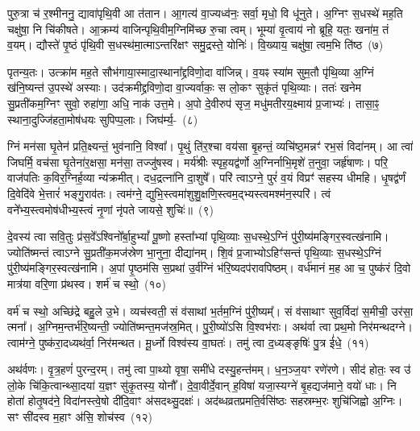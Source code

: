 पुरु॒त्रा च॑ र॒श्मीननु॒ द्यावा॑\-पृथि॒वी आ त॑तान। आ॒गत्य॑ वा॒ज्यध्व॑नः॒ सर्वा॒ मृधो॒ वि धू॑नुते। अ॒ग्निꣳ स॒धस्थे॑ मह॒ति चक्षु॑षा॒ नि चि॑कीषते। आ॒क्रम्य॑ वाजिन्पृथि॒वीम॒ग्निमि॑च्छ रु॒चा त्वम्। भूम्या॑ वृ॒त्वाय॑ नो ब्रूहि॒ यतः॒ खना॑म॒ तं व॒यम्। द्यौस्ते॑ पृ॒ष्ठं पृ॑थि॒वी स॒धस्थ॑मा॒त्माऽन्तरि॑क्षꣳ समु॒द्रस्ते॒ योनिः॑। वि॒ख्याय॒ चक्षु॑षा॒ त्वम॒भि ति॑ष्ठ~(७)\ip

पृतन्य॒तः। उत्क्रा॑म मह॒ते सौभ॑गाया॒स्मादा॒स्थाना᳚द्द्रविणो॒दा वा॑जिन्न्। व॒यꣴ स्या॑म सुम॒तौ पृ॑थि॒व्या अ॒ग्निं ख॑नि॒ष्यन्त॑ उ॒पस्थे॑ अस्याः। उद॑क्रमीद्द्रविणो॒दा वा॒ज्यर्वाकः॒ स लो॒कꣳ सुकृ॑तं पृथि॒व्याः। ततः॑ खनेम सु॒प्रती॑कम॒ग्निꣳ सुवो॒ रुहा॑णा॒ अधि॒ नाक॑ उत्त॒मे। अ॒पो दे॒वीरुप॑ सृज॒ मधु॑मतीरय॒क्ष्माय॑ प्र॒जाभ्यः॑। तासा॒ꣴ॒ स्थाना॒दुज्जि॑हता॒मोष॑धयः सुपिप्प॒लाः। जिघ॑र्म्य॒-~(८)\ip

ग्निं मन॑सा घृ॒तेन॑ प्रति॒क्ष्यन्तं॒ भुव॑नानि॒ विश्वा᳚। पृ॒थुं ति॑र॒श्चा वय॑सा बृ॒हन्तं॒ व्यचि॑ष्ठ॒मन्नꣳ॑ रभ॒सं विदा॑नम्। आ त्वा॑ जिघर्मि॒ वच॑सा घृ॒तेना॑र॒क्षसा॒ मन॑सा॒ तज्जु॑षस्व। मर्य॑श्रीः स्पृह॒यद्व॑र्णो अ॒ग्निर्नाभि॒मृशे॑ त॒नुवा॒ जर्\mbox{}हृ॑षाणः। परि॒ वाज॑पतिः क॒विर॒ग्निर्\mbox{}ह॒व्या न्य॑क्रमीत्। दध॒द्रत्ना॑नि दा॒शुषे᳚। परि॑ त्वा\-ऽग्ने॒ पुरं॑ व॒यं विप्रꣳ॑ सहस्य धीमहि। धृ॒षद्व॑र्णं दि॒वेदि॑वे भे॒त्तारं॑ भङ्गु॒राव॑तः। त्वम॑ग्ने॒ द्युभि॒स्त्वमा॑शुशु॒क्षणि॒स्त्वम॒द्भ्यस्त्वमश्म॑न॒स्परि॑। त्वं वने᳚भ्य॒स्त्वमोष॑धीभ्य॒स्त्वं नृ॒णां नृ॑पते जायसे॒ शुचिः॑॥~(९)\ip

{\anuvakamend[{प्र॒तूर्व॒न्थ्सूर्य॑स्य तिष्ठ॒ जिघ॑र्मि भे॒त्तारं॑ विꣳश॒तिश्च॑}]}

दे॒वस्य॑ त्वा सवि॒तुः प्र॑स॒वे᳚\-ऽश्विनो᳚र्बा॒हु\-भ्यां᳚ पू॒ष्णो हस्ता᳚भ्यां पृथि॒व्याः स॒धस्थे॒\-ऽग्निं पु॑री॒ष्य॑मङ्गिर॒\-स्व\-त्ख॑नामि। ज्योति॑ष्मन्तं त्वाऽग्ने सु॒प्रती॑क॒मज॑स्रेण भा॒नुना॒ दीद्या॑नम्। शि॒वं प्र॒जाभ्यो\-ऽहिꣳ॑सन्तं पृथि॒व्याः स॒धस्थे॒\-ऽग्निं पु॑री॒ष्य॑मङ्गिर॒\-स्वत्ख॑नामि। अ॒पां पृ॒ष्ठम॑सि स॒प्रथा॑ उ॒र्व॑ग्निं भ॑रि॒ष्यदप॑रावपिष्ठम्। वर्ध॑मानं म॒ह आ च॒ पुष्क॑रं दि॒वो मात्र॑या वरि॒णा प्र॑थस्व। शर्म॑ च स्थो॒~(१०)\ip

वर्म॑ च स्थो॒ अच्छि॑द्रे बहु॒ले उ॒भे। व्यच॑स्वती॒ सं व॑साथां भ॒र्तम॒ग्निं पु॑री॒ष्यम्᳚। सं व॑साथाꣳ सुव॒र्विदा॑ स॒मीची॒ उर॑सा॒ त्मना᳚। अ॒ग्निम॒न्तर्भ॑रि॒ष्यन्ती॒ ज्योति॑ष्मन्त॒मज॑स्र॒मित्। पु॒री॒ष्यो॑\-ऽसि वि॒श्वभ॑राः। अथ॑र्वा त्वा प्रथ॒मो निर॑मन्थदग्ने। त्वाम॑ग्ने॒ पुष्क॑रा॒दध्यथ॑र्वा॒ निर॑मन्थत। मू॒र्ध्नो विश्व॑स्य वा॒घतः॑। तमु॑ त्वा द॒ध्यङ्ङृषिः॑ पु॒त्र ई॑धे॒~(११)\ip

अथ॑र्वणः। वृ॒त्र॒हणं॑ पुरन्द॒रम्। तमु॑ त्वा पा॒थ्यो वृषा॒ समी॑धे दस्यु॒हन्त॑मम्। ध॒न॒ञ्ज॒यꣳ रणे॑रणे। सीद॑ होतः॒ स्व उ॑ लो॒के चि॑कि॒त्वान्थ्सा॒दया॑ य॒ज्ञꣳ सु॑कृ॒तस्य॒ योनौ᳚। दे॒वा॒वीर्दे॒वान् ह॒विषा॑ यजा॒स्यग्ने॑ बृ॒हद्यज॑माने॒ वयो॑ धाः। नि होता॑ होतृ॒षद॑ने॒ विदा॑नस्त्वे॒षो दी॑दि॒वाꣳ अ॑सदथ्सु॒दक्षः॑। अद॑ब्धव्रतप्रमति॒र्वसि॑ष्ठः सहस्रम्भ॒रः शुचि॑जिह्वो अ॒ग्निः। सꣳ सी॑दस्व म॒हाꣳ अ॑सि॒ शोच॑स्व~(१२)\ip


